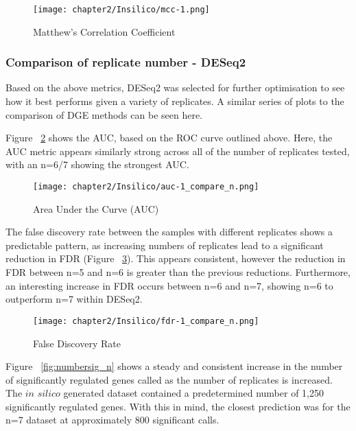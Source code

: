 \begin{figure}[!htbp]
  \centering 
  \texttt{[image: chapter2/Insilico/mcc-1.png]} \\
  \caption[n=3 Matthew's Correlation Coefficient]{Matthew's Correlation Coefficient}
  \label{fig:mcc}
\end{figure} 




\subsubsection{Comparison of replicate number - DESeq2}
Based on the above metrics, DESeq2 was selected for further optimisation to see how it best performs given a variety of replicates. A similar series of plots to the comparison of DGE methods can be seen here. 

Figure ~\ref{fig:auc_n} shows the AUC, based on the ROC curve outlined above. Here, the AUC metric appears similarly strong across all of the number of replicates tested, with an n=6/7 showing the strongest AUC. \\

\begin{figure}[!htbp]
  \centering 
  \texttt{[image: chapter2/Insilico/auc-1\_compare\_n.png]} \\
  \caption[DESeq2 Comparison of Replicates - Area Under the Curve (AUC)]{Area Under the Curve (AUC)}
  \label{fig:auc_n}
\end{figure}

The false discovery rate between the samples with different replicates shows a predictable pattern, as increasing numbers of replicates lead to a significant reduction in FDR (Figure ~\ref{fig:fdr1_n}). This appears consistent, however the reduction in FDR between n=5 and n=6 is greater than the previous reductions. Furthermore, an interesting increase in FDR occurs between n=6 and n=7, showing n=6 to outperform n=7 within DESeq2. \\

\begin{figure}[!htbp]
  \centering 
  \texttt{[image: chapter2/Insilico/fdr-1\_compare\_n.png]} 
  \caption[DESeq2 Comparison of Replicates - False Discovery Rate]{False Discovery Rate}
  \label{fig:fdr1_n}
\end{figure} 

Figure ~\ref{fig:numbersig_n} shows a steady and consistent increase in the number of significantly regulated genes called as the number of replicates is increased. The $\textit{in silico}$ generated dataset contained a predetermined number of 1,250 significantly regulated genes. With this in mind, the closest prediction was for the n=7 dataset at approximately 800 significant calls. 

